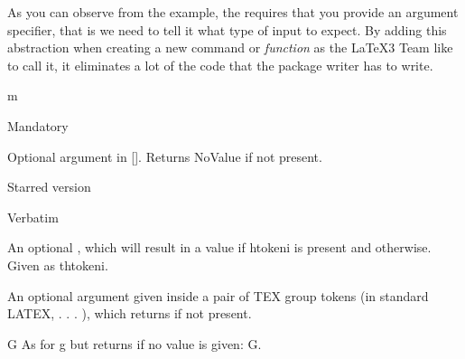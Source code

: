 \DeclareDocumentCommand{}


\begin{flushleft}
\par
\end{flushleft}
As you can observe from the example, the  requires
that you provide an argument specifier, that is we need to tell it what type of
input to expect. By adding this abstraction when creating a new command or
\textit{function} as the LaTeX3 Team like to call it, it eliminates a lot of the
code that the package writer has to write. 



\begin{argumentlist}{m}
\item [m] Mandatory
\item [o] Optional argument in  []. Returns NoValue if not present.
\item [O] 
\item [s] Starred version
\item [v] Verbatim
\item [l]
\item [u]
\item [d]
\item [D] 
\item [t]  An optional , which will result in a value  if htokeni is 
            present and  otherwise. Given as thtokeni.
\item [g] An optional argument given inside a pair of TEX group tokens (in standard LATEX,
              { . . . }), which returns  if not present.
\item [G] G As for g but returns  if no value is given: G.
\end{argumentlist}











